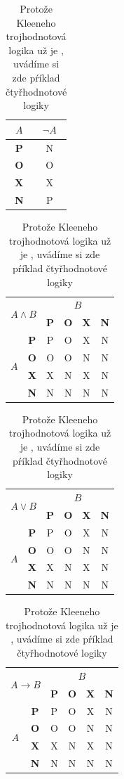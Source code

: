 \documentclass[11pt, a4paper]{article}
\begin{document}
\begin{table}[h]
\begin{tabular}{|c|c|} 
\hline
$A$ & $\neg A$\\ \hline
\textbf{P} & N \\ \hline
\textbf{O} & O \\ \hline
\textbf{X} & X \\ \hline
\textbf{N} & P \\ \hline
\end{tabular}
\begin{tabular}{|c|c|c|c|c|c|}
\hline
\multicolumn{2}{|c|}{\multirow{2}{*}{$A \wedge B$}} & \multicolumn{4}{c|}{$B$}\\ \cline{3-6}
\multicolumn{2}{|c|}{}& \textbf{P} & \textbf{O} & \textbf{X} & \textbf{N} \\\hline \cline{2-6}
\multirow{4}{*}{$A$}& \textbf{P} & P & O & X & N \\\cline{2-6}
& \textbf{O} & O & O & N & N \\\cline{2-6}
& \textbf{X} & X & N & X & N \\ \cline{2-6}
& \textbf{N} & N & N & N & N \\ \hline
\end{tabular}
\begin{tabular}{|c|c|c|c|c|c|}
\hline
\multicolumn{2}{|c|}{\multirow{2}{*}{$A \vee B$}} & \multicolumn{4}{c|}{$B$}\\ \cline{3-6}
\multicolumn{2}{|c|}{}& \textbf{P} & \textbf{O} & \textbf{X} & \textbf{N} \\\hline \cline{2-6}
\multirow{4}{*}{$A$}& \textbf{P} & P & O & X & N \\\cline{2-6}
& \textbf{O} & O & O & N & N \\\cline{2-6}
& \textbf{X} & X & N & X & N \\ \cline{2-6}
& \textbf{N} & N & N & N & N \\ \hline
\end{tabular}
\begin{tabular}{|c|c|c|c|c|c|}
\hline
\multicolumn{2}{|c|}{\multirow{2}{*}{$A \rightarrow B$}} & \multicolumn{4}{c|}{$B$}\\ \cline{3-6}
\multicolumn{2}{|c|}{}&\textbf{P} & \textbf{O} & \textbf{X} & \textbf{N} \\\hline \cline{2-6}
\multirow{4}{*}{$A$}& \textbf{P} & P & O & X & N \\\cline{2-6}
& \textbf{O} & O & O & N & N \\\cline{2-6}
& \textbf{X} & X & N & X & N \\ \cline{2-6}
& \textbf{N} & N & N & N & N \\ \hline
\end{tabular}
\caption{Protože Kleeneho trojhodnotová logika už je , uvádíme si zde pŕíklad čtyřhodnotové logiky}
\label{tab:logika}
\end{table}
\bigskip
\end{document}
